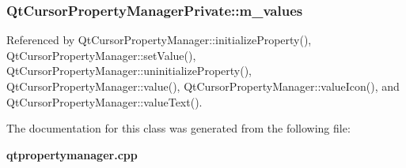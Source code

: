 \subsubsection[{m\+\_\+values}]{ Qt\+Cursor\+Property\+Manager\+Private\+::m\+\_\+values}\label{classQtCursorPropertyManagerPrivate_ad5043c0d676199363ac4200ed455394f}


Referenced by Qt\+Cursor\+Property\+Manager\+::initialize\+Property(), Qt\+Cursor\+Property\+Manager\+::set\+Value(), Qt\+Cursor\+Property\+Manager\+::uninitialize\+Property(), Qt\+Cursor\+Property\+Manager\+::value(), Qt\+Cursor\+Property\+Manager\+::value\+Icon(), and Qt\+Cursor\+Property\+Manager\+::value\+Text().



The documentation for this class was generated from the following file\+:\begin{DoxyCompactItemize}
\item 
{\bf qtpropertymanager.\+cpp}\end{DoxyCompactItemize}

